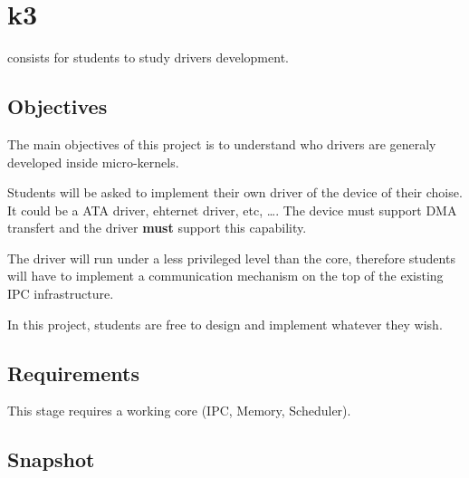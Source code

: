 %
%
%
%
%
%

%
%

\chapter{k3}
\label{chapter:k3}

 consists for students to study drivers development.

\newpage

%
%

%
%

\section{Objectives}

The main objectives of this project is to understand who drivers are
generaly developed inside micro-kernels.

Students will be asked to implement their own driver
of the device of their choise. It could be a ATA driver, ehternet
driver, etc, \ldots{}. The device must support DMA transfert and the
driver \textbf{must} support this capability.

The driver will run under a less privileged level than the core,
therefore students will have to implement a communication mechanism 
on the top of the existing IPC infrastructure.

In this project, students are free to design and implement whatever
they wish.

%
%

\section{Requirements}

This stage requires a working core (IPC, Memory, Scheduler).

%
%

\section{Snapshot}

